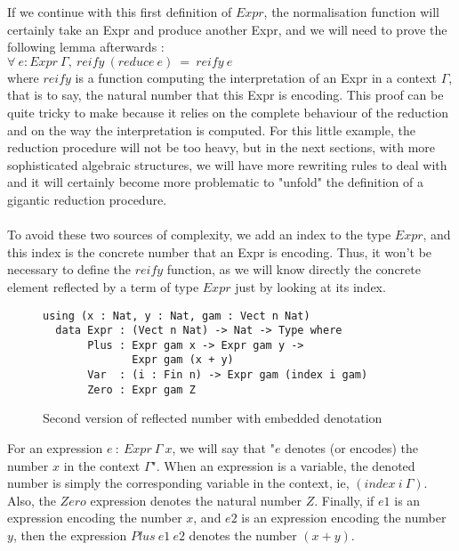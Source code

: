 If we continue with this first definition of $Expr$, the normalisation function will certainly take an Expr and produce another Expr, and we will need to prove the following lemma afterwards : \\
$\forall\ e:Expr\ \Gamma,\ reify\ (reduce\ e)\ =\ reify\ e$ \\
where $reify$ is a function computing the interpretation of an Expr in a context $\Gamma$, that is to say, the natural number that this Expr is encoding.
This proof can be quite tricky to make because it relies on the complete behaviour of the reduction and on the way the interpretation is computed.
For this little example, the reduction procedure will not be too heavy, but in the next sections, with more sophisticated algebraic structures, we will have more rewriting rules to deal with and it will certainly become more problematic to "unfold" the definition of a gigantic reduction procedure. \\
\\
To avoid these two sources of complexity, we add an index to the type $Expr$, and this index is the concrete number that an Expr is encoding. Thus, it won't be necessary to define the $reify$ function, as we will know directly the concrete element reflected by a term of type $Expr$ just by looking at its index. \\


\begin{figure}[H]
\figrule
\begin{center}
\begin{verbatim}
using (x : Nat, y : Nat, gam : Vect n Nat)
  data Expr : (Vect n Nat) -> Nat -> Type where
       Plus : Expr gam x -> Expr gam y -> 
              Expr gam (x + y)
       Var  : (i : Fin n) -> Expr gam (index i gam)
       Zero : Expr gam Z
\end{verbatim}
\end{center}
\caption{Second version of reflected number with embedded denotation}
\figrule
\end{figure}

For an expression $e\ :\ Expr\ \Gamma\ x$, we will say that "$e$ denotes (or encodes) the number $x$ in the context $\Gamma$".
When an expression is a variable, the denoted number is simply the corresponding variable in the context, ie, $(index\ i\ \Gamma)$.
Also, the $Zero$ expression denotes the natural number $Z$.
Finally, if $e1$ is an expression encoding the number $x$, and $e2$ is an expression encoding the number $y$, then the expression $Plus\ e1\ e2$ denotes the number $(x + y)$.


